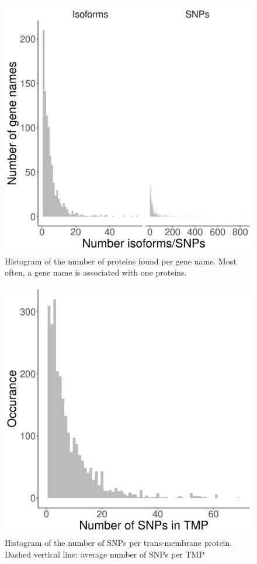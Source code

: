 \begin{figure}[!htbp]
  \includegraphics[width=\textwidth]{ncbi_peregrine_results/fig_n_proteins_per_gene_name.png}
  \caption{
    Histogram of the number of proteins found per gene name.
    Most often, a gene name is associated with one proteins. 
  }
  \label{fig:n_proteins_per_gene_name}
\end{figure}


\begin{figure}[!htbp]
  \includegraphics[width=\textwidth]{ncbi_peregrine_results/fig_n_snps_per_tmp.png}
  \caption{
    Histogram of the number of SNPs per trans-membrane protein.
    Dashed vertical line: average number of SNPs per TMP
  }
  \label{fig:fig_n_snps_per_tmp}
\end{figure}

